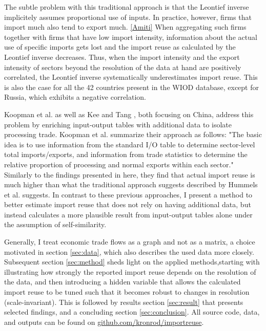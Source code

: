 \documentclass{paper}
\begin{document}
The subtle problem with this traditional approach is that the Leontief inverse implicitely assumes proportional use of inputs. In practice, however, firms that import much also tend to export much. \ref{Amiti} When aggregating such firms together with firms that have low import intensity, information about the actual use of specific imports gets lost and the import reuse as calculated by the Leontief inverse decreases. Thus, when the import intensity and the export intensity of sectors beyond the resolution of the data at hand are positively correlated, the Leontief inverse systematically underestimates import reuse. This is also the case for all the 42 countries present in the WIOD database, except for Russia, which exhibits a negative correlation.

Koopman et al. \cite{koopman2012tracing} as well as Kee and Tang \cite{kee2013domestic}, both focusing on China, address this problem by enriching input-output tables with additional data to isolate processing trade. Koopman et al. summarize their approach as follows: "The basic idea is to use information from the standard I/O table to determine sector-level total imports/exports, and information from trade statistics to determine the relative proportion of processing and normal exports within each sector." Similarly to the findings presented in here, they find that actual import reuse is much higher than what the traditional approach suggests described by Hummels et al. \cite{hummels2001nature} suggests. In contrast to these previous approaches, I present a method to better estimate import reuse that does not rely on having additional data, but instead calculates a more plausible result from input-output tables alone under the assumption of self-similarity.

Generally, I treat economic trade flows as a graph and not as a matrix, a choice motivated in section \ref{sec:data}, which also describes the used data more closely. Subsequent section \ref{sec:method} sheds light on the applied methods,starting with illustrating how strongly the reported import reuse depends on the resolution of the data, and then introducing a hidden variable that allows the calculated import reuse to be tuned such that it becomes robust to changes in resolution (scale-invariant). This is followed by results section \ref{sec:result} that presents selected findings, and a concluding section \ref{sec:conclusion}. All source code, data, and outputs can be found on \href{https://github.com/kronrod/importreuse}{github.com/kronrod/importreuse}.
\end{document}
